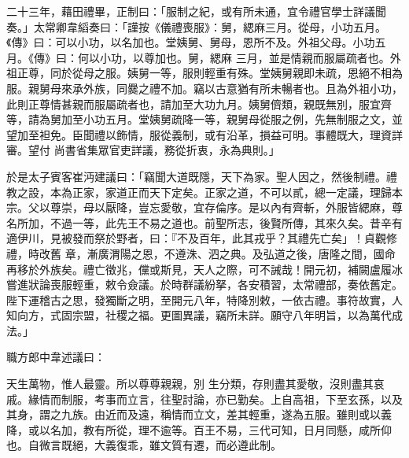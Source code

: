 \begin{pinyinscope}
 二十三年，藉田禮畢，正制曰：「服制之紀，或有所未通，宜令禮官學士詳議聞奏。」太常卿韋縚奏曰：「謹按《儀禮喪服》：舅，緦麻三月。從母，小功五月。《傳》曰：可以小功，以名加也。堂姨舅、舅母，恩所不及。外祖父母。小功五月。《傳》曰：何以小功，以尊加也。舅，緦麻
 三月，並是情親而服屬疏者也。外祖正尊，同於從母之服。姨舅一等，服則輕重有殊。堂姨舅親即未疏，恩絕不相為服。親舅母來承外族，同爨之禮不加。竊以古意猶有所未暢者也。且為外祖小功，此則正尊情甚親而服屬疏者也，請加至大功九月。姨舅儕類，親既無別，服宜齊等，請為舅加至小功五月。堂姨舅疏降一等，親舅母從服之例，先無制服之文，並望加至袒免。臣聞禮以飾情，服從義制，或有沿革，損益可明。事體既大，理資詳審。望付
 尚書省集眾官吏詳議，務從折衷，永為典則。」



 於是太子賓客崔沔建議曰：「竊聞大道既隱，天下為家。聖人因之，然後制禮。禮教之設，本為正家，家道正而天下定矣。正家之道，不可以貳，總一定議，理歸本宗。父以尊崇，母以厭降，豈忘愛敬，宜存倫序。是以內有齊斬，外服皆緦麻，尊名所加，不過一等，此先王不易之道也。前聖所志，後賢所傳，其來久矣。昔辛有適伊川，見被發而祭於野者，曰：『不及百年，此其戎乎？其禮先亡矣」！貞觀修禮，時改舊
 章，漸廣渭陽之恩，不遵洙、泗之典。及弘道之後，唐隆之間，國命再移於外族矣。禮亡徵兆，儻或斯見，天人之際，可不誡哉！開元初，補闕盧履冰嘗進狀論喪服輕重，敕令僉議。於時群議紛拏，各安積習，太常禮部，奏依舊定。陛下運稽古之思，發獨斷之明，至開元八年，特降別敕，一依古禮。事符故實，人知向方，式固宗盟，社稷之福。更圖異議，竊所未詳。願守八年明旨，以為萬代成法。」



 職方郎中韋述議曰：



 天生萬物，惟人最靈。所以尊尊親親，別
 生分類，存則盡其愛敬，沒則盡其哀戚。緣情而制服，考事而立言，往聖討論，亦已勤矣。上自高祖，下至玄孫，以及其身，謂之九族。由近而及遠，稱情而立文，差其輕重，遂為五服。雖則或以義降，或以名加，教有所從，理不逾等。百王不易，三代可知，日月同懸，咸所仰也。自微言既絕，大義復乖，雖文質有遷，而必遵此制。




\end{pinyinscope}
